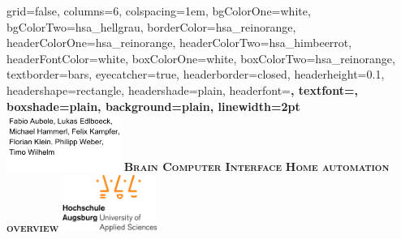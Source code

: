 \documentclass[landscape,final,a1paper,fontscale=0.4]{../baposter/baposter}
\begin{document}



\begin{poster}%
  {
  grid=false,
  columns=6,
  colspacing=1em,
  bgColorOne=white,
  bgColorTwo=hsa_hellgrau,
  borderColor=hsa_reinorange,
  headerColorOne=hsa_reinorange,
  headerColorTwo=hsa_himbeerrot,
  headerFontColor=white,
  boxColorOne=white,
  boxColorTwo=hsa_reinorange,
  textborder=bars,
  eyecatcher=true,
  headerborder=closed,
  headerheight=0.1\textheight,
  headershape=rectangle,
  headershade=plain,
  headerfont=\Large\bf\sc, %
  textfont={\sf\setlength{\parindent}{1.5em}},
  boxshade=plain,
  background=plain,
  linewidth=2pt
  }
  {
  	    \includegraphics[height=5em]{images/names.png}
  } 
  {\bf\textsc{Brain Computer Interface}\vspace{0.5em}
  }
  {\bf\textsc{Home automation overview}
  }
  {%
    \includegraphics[height=5em]{images/hsa_logo_normal.jpg}
}
\end{poster}
\end{document}

